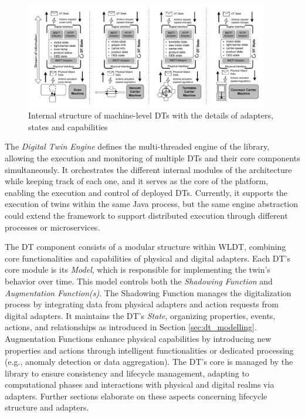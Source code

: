 \begin{figure}[th!]
    \setlength{\belowcaptionskip}{-13pt}
    \centering
    \includegraphics[width=0.95\textwidth]{figures/engineering-wldt/DTs-zoom-in.pdf}
    \caption{Internal structure of machine-level DTs with the details of adapters, states and capabilities}
    \label{fig:dt-internal-structure-overview}
\end{figure}

The \textit{Digital Twin Engine} defines the multi-threaded engine of the library, allowing the execution and monitoring of multiple DTs and their core components simultaneously.
It orchestrates the different internal modules of the architecture while keeping track of each one, and it serves as the core of the platform, enabling the execution and control of deployed DTs.
Currently, it supports the execution of twins within the same Java process, but the same engine abstraction could extend the framework to support distributed execution through different processes or microservices.

The DT component consists of a modular structure within WLDT, combining core functionalities and capabilities of physical and digital adapters.
Each DT's core module is its \textit{Model}, which is responsible for implementing the twin's behavior over time. This model controls both the \textit{Shadowing Function} and \textit{Augmentation Function(s)}.
The Shadowing Function manages the digitalization process by integrating data from physical adapters and action requests from digital adapters.
It maintains the DT's \textit{State}, organizing properties, events, actions, and relationships as introduced in Section \ref{sec:dt_modelling}.
Augmentation Functions enhance physical capabilities by introducing new properties and actions through intelligent functionalities or dedicated processing (e.g., anomaly detection or data aggregation).
The DT's core is managed by the library to ensure consistency and lifecycle management, adapting to computational phases and interactions with physical and digital realms via adapters. 
Further sections elaborate on these aspects concerning lifecycle structure and adapters.

